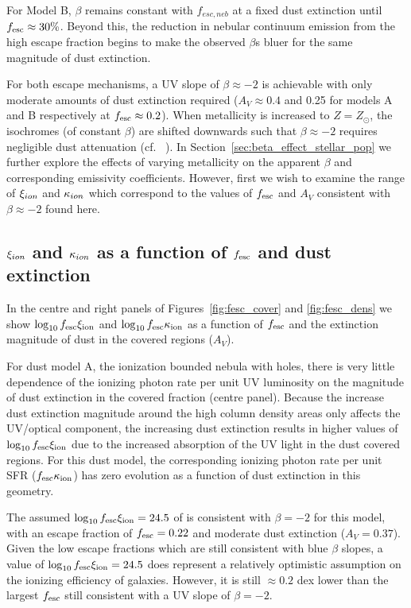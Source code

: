 For Model B, $\beta$ remains constant with $f_{esc,neb}$ at a fixed dust extinction until $f_{\rm{esc}} \approx 30\%$. Beyond this, the reduction in nebular continuum emission from the high escape fraction begins to make the observed $\beta$s bluer for the same magnitude of dust extinction.

For both escape mechanisms, a UV slope of $\beta \approx -2$ is achievable with only moderate amounts of dust extinction required ($A_{V} \approx 0.4$ and 0.25 for models A and B respectively at $f_{\rm{esc}}\approx 0.2$). When metallicity is increased to $Z = Z_{\odot}$, the isochromes (of constant $\beta$) are shifted downwards such that $\beta \approx -2$ requires negligible dust attenuation (cf. \citeauthor{Robertson:2013ji}~\citeyear{Robertson:2013ji}). In Section~\ref{sec:beta_effect_stellar_pop} we further explore the effects of varying metallicity on the apparent $\beta$ and corresponding emissivity coefficients. However, first we wish to examine the range of $\xi_{\lowercase{ion}}$ and $\kappa_{\lowercase{ion}}$ which correspond to the values of $f_{\rm{esc}}$ and $A_{V}$ consistent with $\beta \approx -2$ found here.

\subsection{$\xi_{\lowercase{ion}}$ and $\kappa_{\lowercase{ion}}$ as a function of $f_{\rm{esc}}$ and dust extinction}
In the centre and right panels of Figures~\ref{fig:fesc_cover} and \ref{fig:fesc_dens} we show $\log_{10}f_{\rm{esc}}\xi_{\rm{ion}}$ and $\log_{10}f_{\rm{esc}}\kappa_{\rm{ion}}$ as a function of $f_{\rm{esc}}$ and the extinction magnitude of dust in the covered regions ($A_{V}$).

For dust model A, the ionization bounded nebula with holes, there is very little dependence of the ionizing photon rate per unit UV luminosity on the magnitude of dust extinction in the covered fraction (centre panel). Because the increase dust extinction magnitude around the high column density areas only affects the UV/optical component, the increasing dust extinction results in higher values of $\log_{10}f_{\rm{esc}}\xi_{\rm{ion}}$ due to the increased absorption of the UV light in the dust covered regions. For this dust model, the corresponding ionizing photon rate per unit SFR ($f_{\rm{esc}}\kappa_{\rm{ion}}$) has zero evolution as a function of dust extinction in this geometry.

The assumed  $\log_{10}f_{\rm{esc}}\xi_{\rm{ion}} = 24.5$ of \citet{Robertson:2013ji} is consistent with  $\beta  = -2$ for this model, with an escape fraction of $f_{\rm{esc}} = 0.22$ and moderate dust extinction ($A_{V} = 0.37$). Given the low escape fractions which are still consistent with blue $\beta$ slopes, a value of $\log_{10}f_{\rm{esc}}\xi_{\rm{ion}} = 24.5$ does represent a relatively optimistic assumption on the ionizing efficiency of galaxies. However, it is still $\approx 0.2$ dex lower than the largest $f_{\rm{esc}}$ still consistent with a UV slope of $\beta = -2$.

